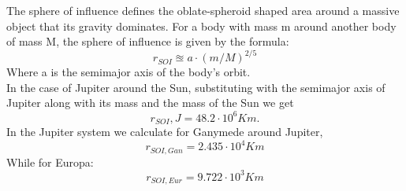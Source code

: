 \label{app:sphere_of_infl}  
The sphere of influence defines the oblate-spheroid shaped area around a massive object that its gravity dominates. For a body with mass m around another body of mass M, the sphere of influence is given by the formula:
\begin{equation}
r_{SOI} \approxeq a\cdot (m/M)^{2/5}
\end{equation}
Where a is the semimajor axis of the body's orbit.\\

\noindent
In the case of Jupiter around the Sun, substituting with the semimajor axis of Jupiter along with its mass and the mass of the Sun we get 
\begin{equation}
r_{SOI},J=48.2\cdot 10^6 Km.     
\end{equation}
In the Jupiter system we calculate for Ganymede around Jupiter,
\begin{equation}
r_{SOI,Gan}=2.435\cdot 10^4 Km    
\end{equation}
While for Europa:
\begin{equation}
r_{SOI,Eur}=9.722\cdot 10^3 Km    
\end{equation}
 